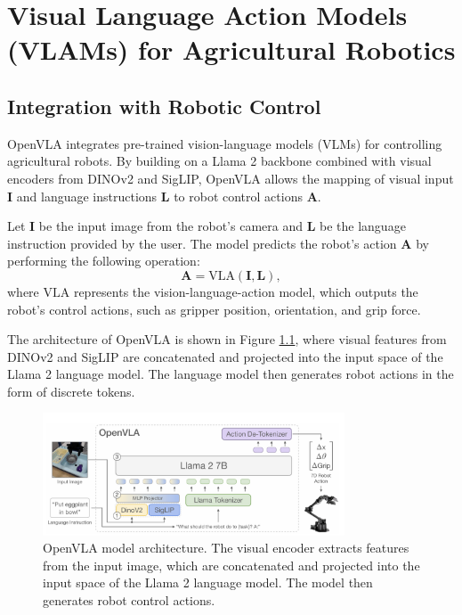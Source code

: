 \chapter{Visual Language Action Models (VLAMs) for Agricultural Robotics}

\section{Integration with Robotic Control}
OpenVLA integrates pre-trained vision-language models (VLMs) \cite{kim2024openvlaopensourcevisionlanguageactionmodel} for controlling agricultural robots. By building on a Llama 2 \cite{touvron2023llamaopenefficientfoundation} backbone combined with visual encoders from DINOv2 and SigLIP, OpenVLA allows the mapping of visual input $\mathbf{I}$ and language instructions $\mathbf{L}$ to robot control actions $\mathbf{A}$.

Let $\mathbf{I}$ be the input image from the robot's camera and $\mathbf{L}$ be the language instruction provided by the user. The model predicts the robot's action $\mathbf{A}$ by performing the following operation:
\[
\mathbf{A} = \text{VLA}(\mathbf{I}, \mathbf{L}),
\]
where $\text{VLA}$ represents the vision-language-action model, which outputs the robot's control actions, such as gripper position, orientation, and grip force.

The architecture of OpenVLA is shown in Figure \ref{fig:openvla_architecture}, where visual features from DINOv2 and SigLIP are concatenated and projected into the input space of the Llama 2 language model. The language model then generates robot actions in the form of discrete tokens.

\begin{figure}[h]
\centering
\includegraphics[width=0.8\textwidth]{openvla.png}
\caption{OpenVLA model architecture. The visual encoder extracts features from the input image, which are concatenated and projected into the input space of the Llama 2 language model. The model then generates robot control actions.}
\label{fig:openvla_architecture}
\end{figure}

